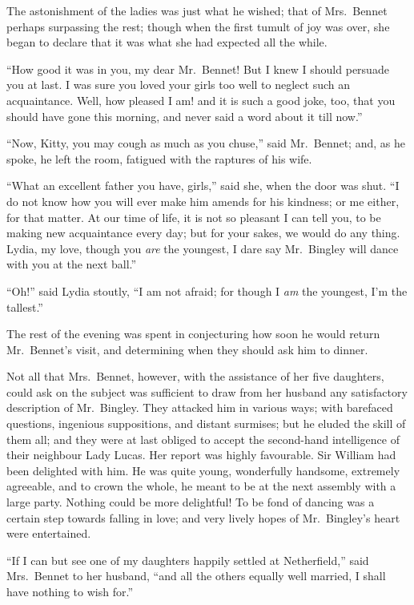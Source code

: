 The astonishment of the ladies was just what he wished;
that of Mrs.\ Bennet perhaps surpassing the rest; though
when the first tumult of joy was over, she began to declare
that it was what she had expected all the while.

“How good it was in you, my dear Mr.\ Bennet! But
I knew I should persuade you at last. I was sure you
loved your girls too well to neglect such an acquaintance.
Well, how pleased I am! and it is such a good joke, too,
that you should have gone this morning, and never said
a word about it till now.”

“Now, Kitty, you may cough as much as you chuse,”
said Mr.\ Bennet; and, as he spoke, he left the room,
fatigued with the raptures of his wife.

“What an excellent father you have, girls,” said she,
when the door was shut. “I do not know how you will
ever make him amends for his kindness; or me either,
for that matter. At our time of life, it is not so pleasant
I can tell you, to be making new acquaintance every day;
but for your sakes, we would do any thing. Lydia, my
love, though you \textit{are} the youngest, I dare say Mr.\ Bingley
will dance with you at the next ball.”

“Oh!” said Lydia stoutly, “I am not afraid; for
though I \textit{am} the youngest, I’m the tallest.”

The rest of the evening was spent in conjecturing how
soon he would return Mr.\ Bennet’s visit, and determining
when they should ask him to dinner.


Not all that Mrs.\ Bennet, however, with the assistance
of her five daughters, could ask on the subject was sufficient
to draw from her husband any satisfactory description
of Mr.\ Bingley. They attacked him in various ways;
with barefaced questions, ingenious suppositions, and
distant surmises; but he eluded the skill of them all;
and they were at last obliged to accept the second-hand
intelligence of their neighbour Lady Lucas. Her report
was highly favourable. Sir William had been delighted
with him. He was quite young, wonderfully handsome,
extremely agreeable, and to crown the whole, he meant to
be at the next assembly with a large party. Nothing
could be more delightful! To be fond of dancing was
a certain step towards falling in love; and very lively
hopes of Mr.\ Bingley’s heart were entertained.

“If I can but see one of my daughters happily settled
at Netherfield,” said Mrs.\ Bennet to her husband, “and
all the others equally well married, I shall have nothing
to wish for.”

